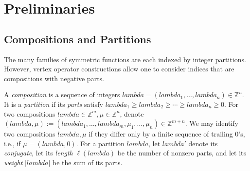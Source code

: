 \documentclass[12pt]{amsart}%
\def\lambda{lambda}%
\theoremstyle{remark}
\theoremstyle{definition}
\newcommand{\Z}{\mathbb{Z}}
\begin{document}


    \section{Preliminaries}\label{section: preliminaries}

    \subsection{Compositions and Partitions}

    The many families of symmetric functions are each indexed by integer partitions. However, vertex operator constructions allow one to consider indices that are compositions with negative parts.

    A \emph{composition} is a sequence of integers $\lambda=(\lambda_1,\ldots,\lambda_n)\in\Z^n$. It is a \emph{partition} if its \emph{parts} satisfy $\lambda_1\geq\lambda_2\geq\cdots\geq\lambda_n\geq0$. For two compositions $\lambda\in\Z^m,\mu\in\Z^n$, denote $(\lambda,\mu):=(\lambda_1,\ldots,\lambda_m,\mu_1,\ldots,\mu_n)\in\Z^{m+n}$. We may identify two compositions $\lambda,\mu$ if they differ only by a finite sequence of trailing $0$'s, i.e., if $\mu=(\lambda,0)$. For a partition $\lambda$, let $\lambda'$ denote its \emph{conjugate}, let its \emph{length} $\ell(\lambda)$ be the number of nonzero parts, and let its \emph{weight} $|\lambda|$ be the sum of its parts.
\end{document}
